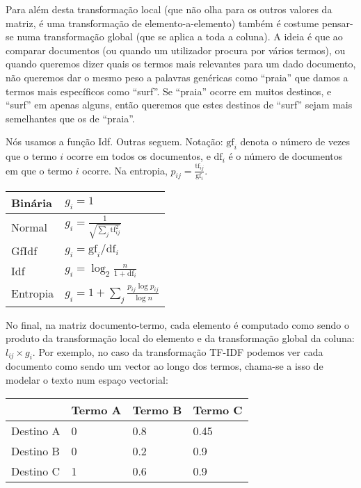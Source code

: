 \documentclass[twocolumn]{article}
\begin{document}
Para além desta transformação local (que não olha para os outros valores da matriz, é uma transformação de elemento-a-elemento) também é costume pensar-se numa transformação global (que se aplica a toda a coluna). A ideia é que ao comparar documentos (ou quando um utilizador procura por vários termos), ou quando queremos dizer quais os termos mais relevantes para um dado documento, não queremos dar o mesmo peso a palavras genéricas como ``praia'' que damos a termos mais específicos como ``surf''. Se ``praia'' ocorre em muitos destinos, e ``surf'' em apenas alguns, então queremos que estes destinos de ``surf'' sejam mais semelhantes que os de ``praia''.

Nós usamos a função Idf. Outras seguem. Notação: $\mathrm{gf}_i$ denota o número de vezes que o termo $i$ ocorre em todos os documentos, e $\mathrm{df}_i$ é o número de documentos em que o termo $i$ ocorre. Na entropia, $p_{ij}=\frac{\mathrm{tf}_{ij}}{\mathrm{gf}_i}$.

\noindent
\begin{center}
\begin{tabularx}{0.75\linewidth}{|l|X|}
\hline
	Binária & $g_i=1$ \\\hline
	Normal & $g_i=\frac{1}{\sqrt{\sum_j\mathrm{tf}_{ij}^2}}$ \\\hline
	GfIdf & $g_i=\mathrm{gf}_i/\mathrm{df}_i$ \\\hline
	Idf & $g_i=\log_2 \frac{n}{1+\mathrm{df}_i}$ \\\hline
	Entropia & $g_i=1+\sum_j \frac{p_{ij}\log p_{ij}}{\log n}$ \\\hline
\end{tabularx}
\end{center}

No final, na matriz documento-termo, cada elemento é computado como sendo o produto da transformação local do elemento e da transformação global da coluna: $l_{ij} \times g_i$. Por exemplo, no caso da transformação TF-IDF podemos ver cada documento como sendo um vector ao longo dos termos, chama-se a isso de modelar o texto num espaço vectorial:

\noindent
\begin{center}
\begin{tabular}{|l|l|l|l|}
\hline
	& Termo A & Termo B & Termo C \\\hline
	Destino A & 0 & 0.8 & 0.45 \\\hline
	Destino B & 0 & 0.2 & 0.9 \\\hline
	Destino C & 1 & 0.6 & 0.9 \\\hline
\end{tabular}
\end{center}
\end{document}
